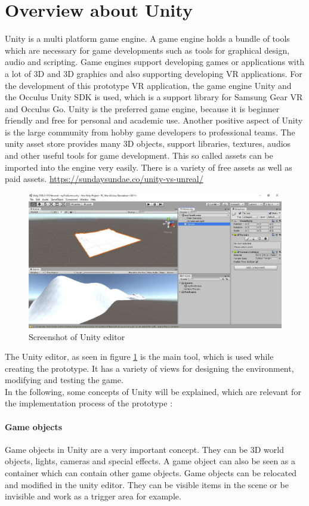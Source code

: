 \section{Overview about Unity}
Unity is a multi platform game engine. A game engine holds a bundle of tools which are necessary for game developments such as tools for graphical design, audio and scripting. Game engines support developing games or applications with a lot of 3D and 3D graphics and also supporting developing VR applications.
For the development of this prototype VR application, the game engine Unity and the Occulus Unity SDK is used, which is a support library for Samsung Gear VR and Occulus Go. Unity is the preferred game engine, because it is beginner friendly and free for personal and academic use. Another positive aspect of Unity is the large community from hobby game developers to professional teams. The unity asset store provides many 3D objects, support libraries, textures, audios and other useful tools for game development. This so called assets can be imported into the engine very easily. There is a variety of free assets as well as paid assets. \url{https://sundaysundae.co/unity-vs-unreal/}\\
\begin{figure}[h!]
  \includegraphics[width=16cm]{kapitel/eps/editor.pdf}
  \centering
  \caption{Screenshot of Unity editor}
  \label{fig:unity-editor}
\end{figure}
The Unity editor, as seen in figure \ref{fig:unity-editor} is the main tool, which is used while creating the prototype. It has a variety of views for designing the environment, modifying and testing the game. \\
In the following, some concepts of Unity will be explained, which are  relevant for the implementation process of the prototype \cite{??}:
\paragraph{Game objects} Game objects in Unity are a very important concept. They can be 3D world objects, lights, cameras and special effects. A game object can also be seen as a container which can contain other game objects. Game objects can be relocated and modified in the unity editor. They can be visible items in the scene or be invisible and work as a trigger area for example.
